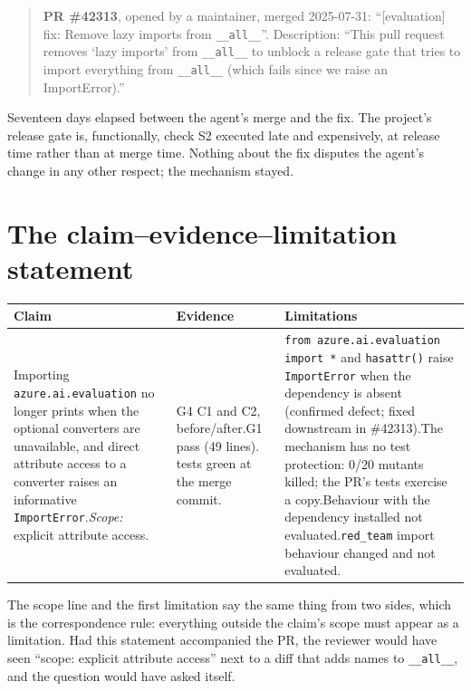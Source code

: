 \documentclass[11pt,a4paper]{article}
\newcommand{\code}[1]{\texttt{#1}}
\begin{document}
\begin{quote}
\textbf{PR \#42313}, opened by a maintainer, merged 2025-07-31: ``[evaluation] fix: Remove lazy imports from \code{\_\_all\_\_}''. Description: ``This pull request removes `lazy imports' from \code{\_\_all\_\_} to unblock a release gate that tries to import everything from \code{\_\_all\_\_} (which fails since we raise an ImportError).''
\end{quote}

Seventeen days elapsed between the agent's merge and the fix. The project's release gate is, functionally, check S2 executed late and expensively, at release time rather than at merge time. Nothing about the fix disputes the agent's change in any other respect; the mechanism stayed.

\section{The claim--evidence--limitation statement}
\begin{center}\small
\begin{tabularx}{\textwidth}{X X X}
\toprule
\textbf{Claim} & \textbf{Evidence} & \textbf{Limitations} \\
\midrule
Importing \code{azure.ai.evaluation} no longer prints when the optional converters are unavailable, and direct attribute access to a converter raises an informative \code{ImportError}.\newline\emph{Scope:} explicit attribute access. &
G4 C1 and C2, before/after.\newline G1 pass (49 lines).\newline 41 tests green at the merge commit. &
\code{from azure.ai.evaluation import *} and \code{hasattr()} raise \code{ImportError} when the dependency is absent (confirmed defect; fixed downstream in \#42313).\newline The mechanism has no test protection: 0/20 mutants killed; the PR's tests exercise a copy.\newline Behaviour with the dependency installed not evaluated.\newline \code{red\_team} import behaviour changed and not evaluated. \\
\bottomrule
\end{tabularx}
\end{center}
The scope line and the first limitation say the same thing from two sides, which is the correspondence rule: everything outside the claim's scope must appear as a limitation. Had this statement accompanied the PR, the reviewer would have seen ``scope: explicit attribute access'' next to a diff that adds names to \code{\_\_all\_\_}, and the question would have asked itself.
\end{document}

